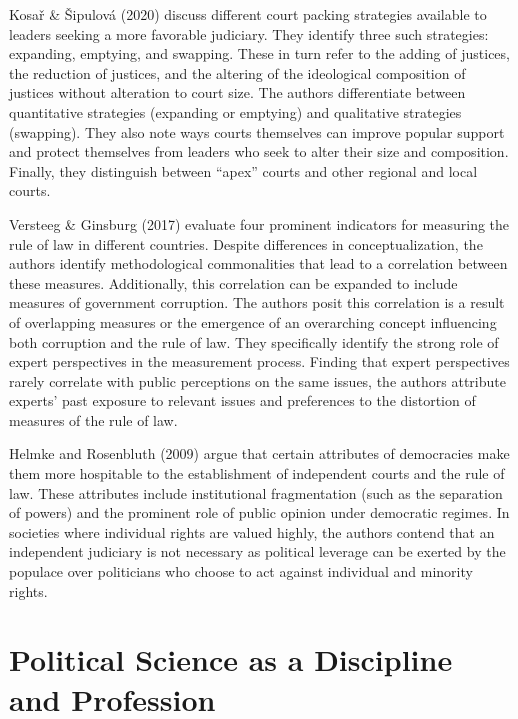 \documentclass[
  english,
  man]{apa6}
\begin{document}
Kosař \& Šipulová (2020) discuss different court packing strategies available to leaders seeking a more favorable judiciary. They identify three such strategies: expanding, emptying, and swapping. These in turn refer to the adding of justices, the reduction of justices, and the altering of the ideological composition of justices without alteration to court size. The authors differentiate between quantitative strategies (expanding or emptying) and qualitative strategies (swapping). They also note ways courts themselves can improve popular support and protect themselves from leaders who seek to alter their size and composition. Finally, they distinguish between \enquote{apex} courts and other regional and local courts.

Versteeg \& Ginsburg (2017) evaluate four prominent indicators for measuring the rule of law in different countries. Despite differences in conceptualization, the authors identify methodological commonalities that lead to a correlation between these measures. Additionally, this correlation can be expanded to include measures of government corruption. The authors posit this correlation is a result of overlapping measures or the emergence of an overarching concept influencing both corruption and the rule of law. They specifically identify the strong role of expert perspectives in the measurement process. Finding that expert perspectives rarely correlate with public perceptions on the same issues, the authors attribute experts' past exposure to relevant issues and preferences to the distortion of measures of the rule of law.

Helmke and Rosenbluth (2009) argue that certain attributes of democracies make them more hospitable to the establishment of independent courts and the rule of law. These attributes include institutional fragmentation (such as the separation of powers) and the prominent role of public opinion under democratic regimes. In societies where individual rights are valued highly, the authors contend that an independent judiciary is not necessary as political leverage can be exerted by the populace over politicians who choose to act against individual and minority rights.

\hypertarget{political-science-as-a-discipline-and-profession}{%
\section{Political Science as a Discipline and Profession}\label{political-science-as-a-discipline-and-profession}}
\end{document}

